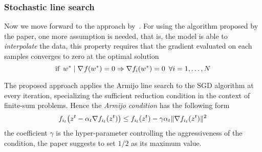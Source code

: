 
\subsubsection{Stochastic line search}

Now we move forward to the approach by~\textcite{vaswani_painless_2019}. For using the algorithm proposed by the paper, one more assumption is needed, that is, the model is able to \emph{interpolate} the data, this property requires that the gradient evaluated on each samples converges to zero at the optimal solution
\[
\text{if}\,\,\,w^\ast\mid\nabla\operatorname*{\mathit{f}}(w^\ast)=0\Rightarrow\nabla f_i(w^\ast)=0\,\,\,\forall i=1,\dots,N
\]

The proposed approach applies the Armijo line search to the SGD algorithm at every iteration, specializing the sufficient reduction condition in the context of finite-sum problems. Hence the \emph{Armijo condition} has the following form
\begin{equation}\label{eq:mini-armijo}
f_{i_t}\bigl(z^t-\alpha_t\nabla f_{i_t}(z^t)\bigr)\leq f_{i_t}(z^t)-\gamma\alpha_t\lVert\nabla f_{i_t}(z^t)\rVert^2
\end{equation}
the coefficient $\gamma$ is the hyper-parameter controlling the aggressiveness of the condition, the paper suggests to set $1/2$ as its maximum value.


